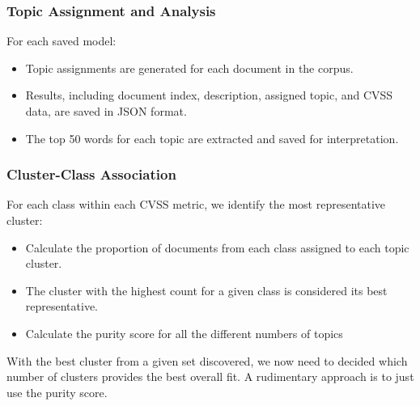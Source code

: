 \documentclass[12pt]{article}
\begin{document}




\subsubsection{Topic Assignment and Analysis}

For each saved model:

\begin{itemize}

	\item Topic assignments are generated for each document in the corpus.

	\item Results, including document index, description, assigned topic, and CVSS data, are saved
	      in JSON format.

	\item The top 50 words for each topic are extracted and saved for interpretation.

\end{itemize}


\subsubsection{Cluster-Class Association}

For each class within each CVSS metric, we identify the most representative cluster:

\begin{itemize}

	\item Calculate the proportion of documents from each class assigned to each topic cluster.

	\item The cluster with the highest count for a given class is considered its best representative.

	\item Calculate the purity score for all the different numbers of topics

\end{itemize}

With the best cluster from a given set discovered, we now need to decided which number of clusters
provides the best overall fit. A rudimentary approach is to just use the purity score.
\end{document}
